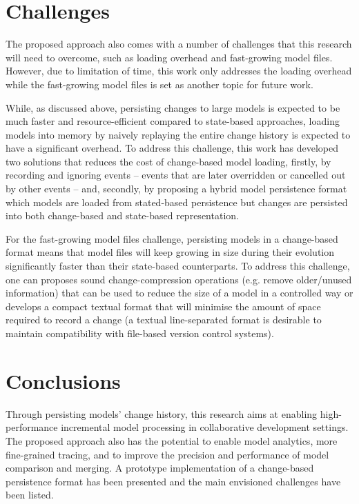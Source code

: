 \section{Challenges}
\label{sec:challenges}
The proposed approach also comes with a number of challenges that this research will need to overcome, such as loading overhead and fast-growing model files. However, due to limitation of time, this work only addresses the loading overhead while the fast-growing model files is set as another topic for future work.  

While, as discussed above, persisting changes to large models is expected to be much faster and resource-efficient compared to state-based approaches, loading models into memory by naively replaying the entire change history is expected to have a significant overhead. To address this challenge, this work has developed two solutions that reduces the cost of change-based model loading, firstly, by recording and ignoring events -- events that are later overridden or cancelled out by other events -- and, secondly, by proposing a hybrid model persistence format which models are loaded from stated-based persistence but changes are persisted into both change-based and state-based representation. 

For the fast-growing model files challenge, persisting models in a change-based format means that model files will keep growing in size during their evolution significantly faster than their state-based counterparts. To address this challenge, one can proposes sound change-compression operations (e.g. remove older/unused information) that can be used to reduce the size of a model in a controlled way or develops a compact textual format that will minimise the amount of space required to record a change (a textual line-separated format is desirable to maintain compatibility with file-based version control systems).  

\section{Conclusions}
\label{sec:conclusions_2}
Through persisting models' change history, this research aims at enabling high-performance incremental model processing in collaborative development settings. The proposed approach also has the potential to enable model analytics, more fine-grained tracing, and to improve the precision and performance of model comparison and merging. A prototype implementation of a change-based persistence format has been presented and the main envisioned challenges have been listed. 